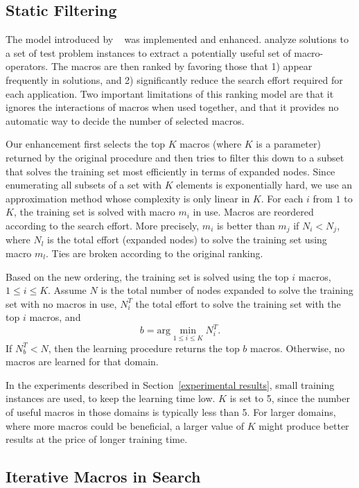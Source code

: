 \documentclass{article}
\begin{document}
\subsection{Static Filtering}
\label{static filtering}

The model introduced by \citeauthor{Botea:05}~
was implemented and enhanced.
\citeauthor{Botea:05} analyze solutions to a set of test problem instances
to extract a potentially useful set of macro-operators.
The macros are then ranked by favoring those that
1) appear frequently in solutions, and
2) significantly reduce the search effort required for each application.
Two important limitations of this ranking model are that it ignores the interactions
of macros when used together, and that it provides no automatic way to 
decide the number of selected macros.

Our enhancement first selects the top $K$ macros (where $K$ is a parameter)
returned by the original procedure and then tries to filter this down to a subset
that solves the training set most efficiently in terms of expanded nodes.
Since enumerating all subsets of a set with $K$ elements is exponentially hard, 
we use an approximation method whose complexity is only linear in $K$.
For each $i$ from $1$ to $K$,
the training set is solved with macro $m_i$ in use.
Macros are reordered according to the search effort.
More precisely, $m_i$ is better than $m_j$ if $N_i < N_j$, 
where $N_l$ is the total effort (expanded nodes)
to solve the training set using macro $m_l$.
Ties are broken according to the original ranking.

Based on the new ordering, the training set is solved using the top $i$ macros,
$1 \leq i \leq K$. Assume $N$ is the total number of nodes expanded to solve
the training set with no macros in use, $N^{T}_{i}$ the total effort to solve the training
set with the top $i$ macros, and 
\[ b = \mbox{arg}\min_{1 \leq i \leq K} N^{T}_{i}.\]
If $N^{T}_{b} < N$, then the learning procedure returns the top $b$ macros.
Otherwise, no macros are learned for that domain.

In the experiments described in Section~\ref{experimental results},
small training instances are used, to keep the learning time low.
$K$ is set to 5, since the number of useful macros in those domains
is typically less than 5.
For larger domains, where more macros could be beneficial, 
a larger value of $K$ might produce better results at the price
of longer training time.

\subsection{Iterative Macros in Search}
\label{search}
\end{document}
